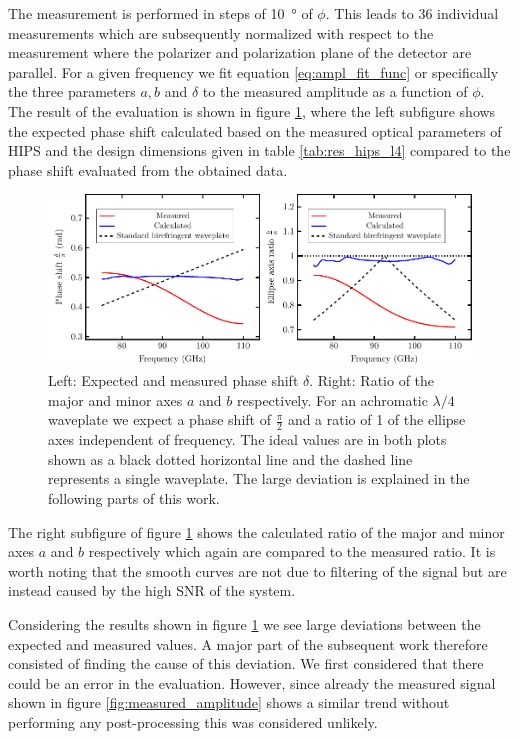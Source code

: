 The measurement is performed in steps of \SI{10}{\degree} of $\phi$. This leads to 36 individual measurements which are subsequently normalized with respect to the measurement where the polarizer and polarization plane of the detector are parallel. For a given frequency we fit equation \ref{eq:ampl_fit_func} or specifically the three parameters $a,b$ and $\delta$ to the measured amplitude as a function of $\phi$. The result of the evaluation is shown in figure \ref{fig:meas_result}, where the left subfigure shows the expected phase shift calculated based on the measured optical parameters of HIPS and the design dimensions given in table \ref{tab:res_hips_l4} compared to the phase shift evaluated from the obtained data. 

\begin{figure}[H]
    \centering
    \includegraphics[scale=0.65]{images/results/plots/polymer/measurement_result.pdf}
    \caption{Left: Expected and measured phase shift $\delta$. Right: Ratio of the major and minor axes $a$ and $b$ respectively. For an achromatic $\lambda/4$ waveplate we expect a phase shift of $\frac{\pi}{2}$ and a ratio of 1 of the ellipse axes independent of frequency. The ideal values are in both plots shown as a black dotted horizontal line and the dashed line represents a single waveplate. The large deviation is explained in the following parts of this work.}
    \label{fig:meas_result}
\end{figure}

The right subfigure of figure \ref{fig:meas_result} shows the calculated ratio of the major and minor axes $a$ and $b$ respectively which again are compared to the measured ratio. It is worth noting that the smooth curves are not due to filtering of the signal but are instead caused by the high SNR of the system.

Considering the results shown in figure \ref{fig:meas_result} we see large deviations between the expected and measured values. A major part of the subsequent work therefore consisted of finding the cause of this deviation. We first considered that there could be an error in the evaluation. However, since already the measured signal shown in figure \ref{fig:measured_amplitude} shows a similar trend without performing any post-processing this was considered unlikely.

